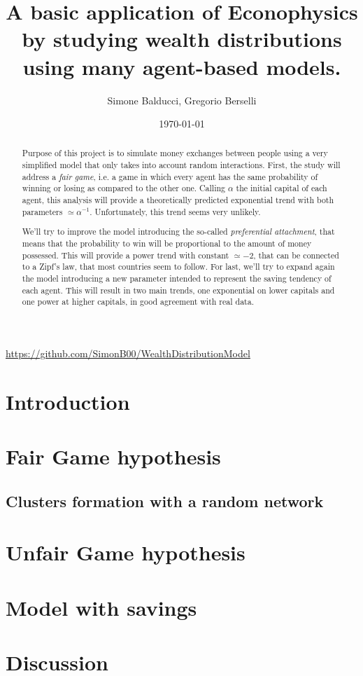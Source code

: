 \documentclass[12pt,a4paper]{article}
\title{A basic application of Econophysics by studying wealth distributions using many agent-based models.}
\author{Simone Balducci, Gregorio Berselli}
\date{\today}
\begin{document}
\maketitle
\begin{center}
	\url{https://github.com/SimonB00/WealthDistributionModel}
\end{center}

\begin{abstract}
    Purpose of this project is to simulate money exchanges between people using a very simplified model that only takes into account random interactions.
    First, the study will address a \emph{fair game}, i.e. a game in which every agent has the same probability of winning or losing as compared to the other one.
    Calling $\alpha$ the initial capital of each agent, this analysis will provide a theoretically predicted exponential trend with both parameters $\simeq \alpha^{-1}$. 
    Unfortunately, this trend seems very unlikely.

    We'll try to improve the model introducing the so-called \emph{preferential attachment}, that means that the probability to win will be proportional to the amount of money possessed.
    This will provide a power trend with constant $\simeq -2$, that can be connected to a Zipf's law, that most countries seem to follow.
    For last, we'll try to expand again the model introducing a new parameter intended to represent the saving tendency of each agent.
    This will result in two main trends, one exponential on lower capitals and one power at higher capitals, in good agreement with real data. 
\end{abstract}
\thispagestyle{empty}

\newpage
\thispagestyle{empty}
\addtocounter{page}{-2}
\mbox{}

\tableofcontents
\pagebreak

\section*{Introduction}

\pagebreak

\section{Fair Game hypothesis}


\subsection{Clusters formation with a random network}

\pagebreak

\section{Unfair Game hypothesis}

\pagebreak

\section{Model with savings}

\pagebreak
\clearpage

\section{Discussion}


\newpage
\thispagestyle{empty}
\mbox{}

\printbibliography
\end{document}
